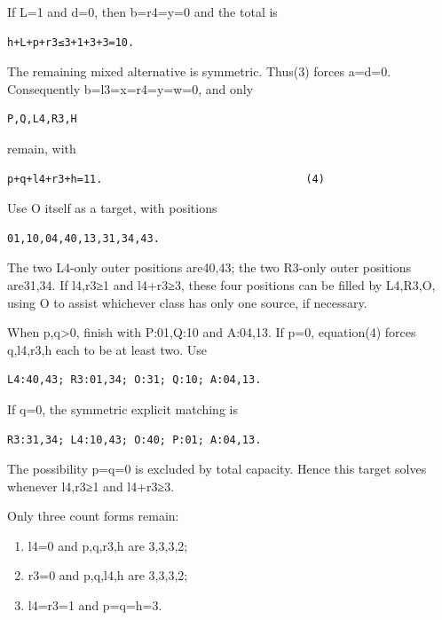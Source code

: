 \documentclass[
  10pt,
]{article}
\providecommand{\tightlist}{%
  \setlength{\itemsep}{0pt}\setlength{\parskip}{0pt}}
\begin{document}
If L=1 and d=0, then b=r4=y=0 and the total is

\begin{verbatim}
h+L+p+r3≤3+1+3+3=10.
\end{verbatim}

The remaining mixed alternative is symmetric. Thus(3) forces a=d=0.
Consequently b=l3=x=r4=y=w=0, and only

\begin{verbatim}
P,Q,L4,R3,H
\end{verbatim}

remain, with

\begin{verbatim}
p+q+l4+r3+h=11.                                (4)
\end{verbatim}

Use O itself as a target, with positions

\begin{verbatim}
01,10,04,40,13,31,34,43.
\end{verbatim}

The two L4-only outer positions are40,43; the two R3-only outer
positions are31,34. If l4,r3≥1 and l4+r3≥3, these four positions can be
filled by L4,R3,O, using O to assist whichever class has only one
source, if necessary.

When p,q\textgreater0, finish with P:01,Q:10 and A:04,13. If p=0,
equation(4) forces q,l4,r3,h each to be at least two. Use

\begin{verbatim}
L4:40,43; R3:01,34; O:31; Q:10; A:04,13.
\end{verbatim}

If q=0, the symmetric explicit matching is

\begin{verbatim}
R3:31,34; L4:10,43; O:40; P:01; A:04,13.
\end{verbatim}

The possibility p=q=0 is excluded by total capacity. Hence this target
solves whenever l4,r3≥1 and l4+r3≥3.

Only three count forms remain:

\begin{enumerate}
\def\labelenumi{\arabic{enumi}.}
\tightlist
\item
  l4=0 and p,q,r3,h are 3,3,3,2;
\item
  r3=0 and p,q,l4,h are 3,3,3,2;
\item
  l4=r3=1 and p=q=h=3.
\end{enumerate}
\end{document}
